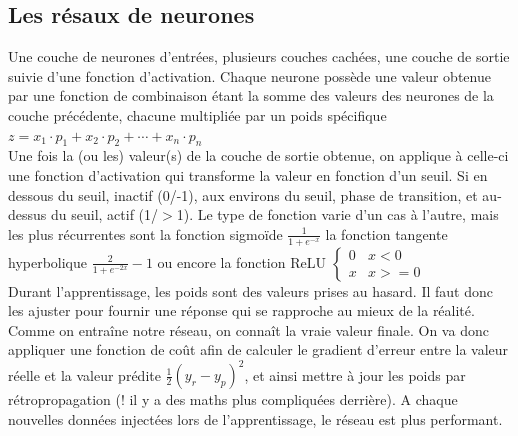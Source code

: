\documentclass[a4paper, 12pt]{article}
\numberwithin{equation}{subsection}
\begin{document}
\subsection{Les résaux de neurones}
Une couche de neurones d’entrées, plusieurs couches cachées, une couche de sortie suivie d’une fonction d’activation.
Chaque neurone possède une valeur obtenue par une fonction de combinaison étant la somme des valeurs des neurones de la couche précédente, chacune multipliée par un poids spécifique
$ z = x_1 \cdot p_1 + x_2 \cdot p_2 + \cdots + x_n \cdot p_n $ \\
Une fois la (ou les) valeur(s) de la couche de sortie obtenue, on applique à celle-ci une fonction d’activation qui transforme la valeur en fonction d’un seuil. Si en dessous du seuil, inactif (0/-1), aux environs du seuil, phase de transition, et au-dessus du seuil, actif (1/$>$1). Le type de fonction varie d’un cas à l’autre, mais les plus récurrentes sont la fonction sigmoïde $ \frac{1}{1 + e^{-x}} $ la fonction tangente hyperbolique $ \frac{2} {1 + e^{-2x}} -1 $
ou encore la fonction ReLU $ \begin{cases} 0 & x < 0 \\ x & x >= 0 \end{cases} $ \\
Durant l’apprentissage, les poids sont des valeurs prises au hasard. Il faut donc les ajuster pour fournir une réponse qui se rapproche au mieux de la réalité. Comme on entraîne notre réseau, on connaît la vraie valeur finale. On va donc appliquer une fonction de coût afin de calculer le gradient d’erreur entre la valeur réelle et la valeur prédite $ \frac{1}{2}(y_r - y_p)^2 $, et ainsi mettre à jour les poids par rétropropagation (! il y a des maths plus compliquées derrière). A chaque nouvelles données injectées lors de l’apprentissage, le réseau est plus performant.
\end{document}
